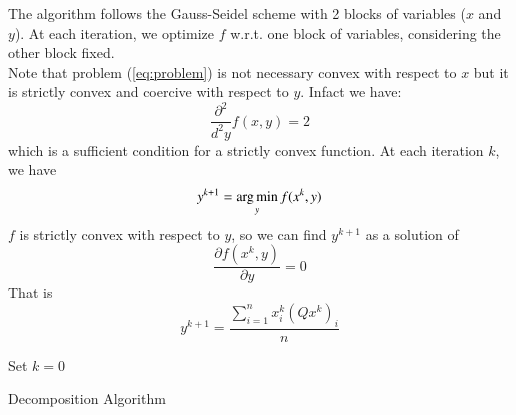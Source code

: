 The algorithm follows the Gauss-Seidel scheme with 2 blocks of variables ($x$ and $y$). At each iteration, we optimize $f$ w.r.t. one block of variables, considering the other block fixed. \\
Note that problem (\ref{eq:problem}) is not necessary convex with respect to $x$ but it is strictly convex and coercive with respect to $y$. Infact we have:
\begin{equation}
\frac{\partial^2}{d^2y} f(x,y) = 2 
\end{equation}
which is a sufficient condition for a strictly convex function. At each iteration $k$, we have 
\begin{equation}\label{eq:updatey}
y^{k+1} = \operatorname*{arg\,min}_y f(x^{k},y)
\end{equation}
$f$ is strictly convex with respect to $y$, so we can find $y^{k+1}$ as a solution of
\begin{equation}
\frac{\partial f(x^{k},y)}{\partial y} = 0 
\end{equation}
That is
\begin{equation}
y^{k+1} = \frac{\sum_{i=1}^n x_i^{k} (Q x^{k})_i}{n}
\end{equation}


\begin{algorithm}[ht]
 Set $k = 0$\\
 \caption{Decomposition Algorithm}
\end{algorithm}

